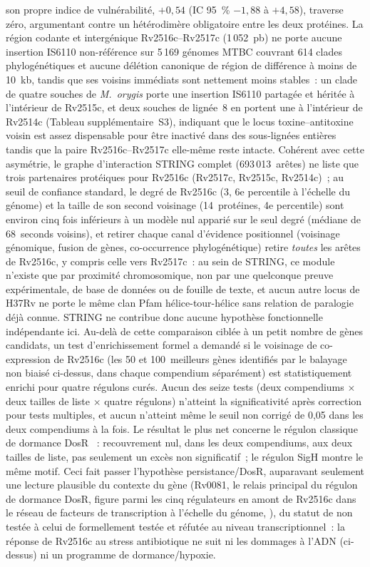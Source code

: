 \documentclass[11pt,a4paper]{article}
\begin{document}
son propre indice de vulnérabilité, $+0,54$ (IC 95~\% $-1,88$ à $+4,58$), traverse zéro,
argumentant contre un hétérodimère obligatoire entre les deux protéines. La région codante et
intergénique Rv2516c--Rv2517c (1\,052~pb) ne porte aucune insertion IS6110 non-référence sur
5\,169 génomes MTBC couvrant 614 clades phylogénétiques et aucune délétion canonique de région de
différence à moins de 10~kb, tandis que ses voisins immédiats sont nettement moins stables~: un
clade de quatre souches de \textit{M.\ orygis} porte une insertion IS6110 partagée et héritée à
l'intérieur de Rv2515c, et deux souches de lignée~8 en portent une à l'intérieur de Rv2514c
(Tableau supplémentaire~S3), indiquant que le locus toxine--antitoxine voisin est assez dispensable pour être inactivé dans des
sous-lignées entières tandis que la paire Rv2516c--Rv2517c elle-même reste intacte. Cohérent avec cette
asymétrie, le graphe d'interaction STRING complet (693\,013~arêtes) ne liste que trois partenaires
protéiques pour Rv2516c (Rv2517c, Rv2515c, Rv2514c)~; au seuil de confiance standard, le degré de
Rv2516c (3, 6e percentile à l'échelle du génome) et la taille de son second voisinage
(14~protéines, 4e percentile) sont environ cinq fois inférieurs à un modèle nul apparié sur le seul
degré (médiane de 68~seconds voisins), et retirer chaque canal d'évidence positionnel (voisinage
génomique, fusion de gènes, co-occurrence phylogénétique) retire \emph{toutes} les arêtes de
Rv2516c, y compris celle vers Rv2517c~: au sein de STRING, ce module n'existe que par proximité
chromosomique, non par une quelconque preuve expérimentale, de base de données ou de fouille de
texte, et aucun autre locus de H37Rv ne porte le même clan Pfam hélice-tour-hélice sans relation de
paralogie déjà connue. STRING ne contribue donc aucune hypothèse fonctionnelle indépendante ici.
Au-delà de cette comparaison ciblée à un petit nombre de gènes candidats, un test d'enrichissement
formel a demandé si le voisinage de co-expression de Rv2516c (les 50 et 100~meilleurs gènes
identifiés par le balayage non biaisé ci-dessus, dans chaque compendium séparément) est
statistiquement enrichi pour quatre régulons curés. Aucun des seize tests (deux compendiums
$\times$ deux tailles de liste $\times$ quatre régulons) n'atteint la significativité après
correction pour tests multiples, et aucun n'atteint même le seuil non corrigé de 0,05 dans les deux
compendiums à la fois. Le résultat le plus net concerne le régulon classique de dormance DosR
\citep{rustad2008dosr}~: recouvrement nul, dans les deux compendiums, aux deux tailles de liste, pas
seulement un excès non significatif~; le régulon SigH montre le même motif. Ceci fait passer
l'hypothèse persistance/DosR, auparavant seulement une lecture plausible du contexte du gène (Rv0081,
le relais principal du régulon de dormance DosR, figure parmi les cinq régulateurs en amont de
Rv2516c dans le réseau de facteurs de transcription à l'échelle du génome,
\citep{minch2015network}), du statut de non testée à celui de formellement testée et réfutée au
niveau transcriptionnel~: la réponse de Rv2516c au stress antibiotique ne suit ni les dommages à
l'ADN (ci-dessus) ni un programme de dormance/hypoxie.
\end{document}
